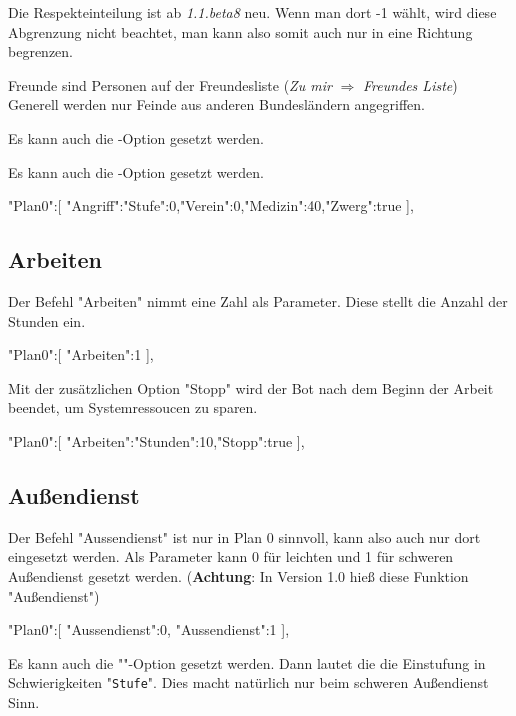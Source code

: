 \documentclass{scrartcl}
\begin{document}
Die Respekteinteilung ist ab \textit{1.1.beta8} neu. Wenn man dort -1 wählt, wird diese Abgrenzung nicht beachtet, man kann also somit auch nur in eine Richtung begrenzen.

Freunde sind Personen auf der Freundesliste (\textit{Zu mir} $\Rightarrow$ \textit{Freundes Liste}) \\
Generell werden nur Feinde aus anderen Bundesländern angegriffen.

Es kann auch die -Option gesetzt werden.

Es kann auch die -Option gesetzt werden.

\begin{code}[language=bash]
"Plan0":[
	{"Angriff":{"Stufe":0,"Verein":0,"Medizin":40,"Zwerg":true}}
],
\end{code}

\subsection{Arbeiten}
\label{Arbeiten}
Der Befehl "Arbeiten" nimmt eine Zahl als Parameter. Diese stellt die Anzahl der Stunden ein.

\begin{code}[language=bash]
"Plan0":[
	{"Arbeiten":1}
],
\end{code}

Mit der zusätzlichen Option "Stopp" wird der Bot nach dem Beginn der Arbeit beendet, um Systemressoucen zu sparen.

\begin{code}[language=bash]
"Plan0":[	
	{"Arbeiten":{"Stunden":10,"Stopp":true}}
],
\end{code}

\subsection{Außendienst}
\label{Aussendienst}
Der Befehl "Aussendienst" ist nur in Plan 0 sinnvoll, kann also auch nur dort eingesetzt werden. Als Parameter kann 0 für leichten und 1 für schweren Außendienst gesetzt werden. (\textbf{Achtung}: In Version 1.0 hieß diese Funktion "Außendienst")

\begin{code}[language=bash]
"Plan0":[
	{"Aussendienst":0},
	{"Aussendienst":1}
],
\end{code}

Es kann auch die ""-Option gesetzt werden. Dann lautet die die Einstufung in Schwierigkeiten "\texttt{Stufe}". Dies macht natürlich nur beim schweren Außendienst Sinn.
\end{document}
